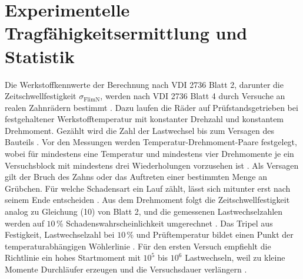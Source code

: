 \section{Experimentelle Tragfähigkeitsermittlung und Statistik}
\label{sec:experiment_stand}

Die Werkstoffkennwerte der Berechnung nach VDI 2736 Blatt 2, darunter die Zeitschwellfestigkeit $\sigma_{\mathrm{FlimN}}$, werden nach VDI 2736 Blatt 4 durch Versuche an realen Zahnrädern bestimmt \cite[Abschnitt~3, S.~5]{VDI2736-4}. Dazu laufen die Räder auf Prüfstandsgetrieben bei festgehaltener Werkstofftemperatur mit konstanter Drehzahl und konstantem Drehmoment. Gezählt wird die Zahl der Lastwechsel bis zum Versagen des Bauteils \cite[S.~6]{VDI2736-4}. Vor den Messungen werden Temperatur-Drehmoment-Paare festgelegt, wobei für mindestens eine Temperatur und mindestens vier Drehmomente je ein Versuchsblock mit mindestens drei Wiederholungen vorzusehen ist \cite[Abschnitt~3.1, S.~6]{VDI2736-4}. Als Versagen gilt der Bruch des Zahns oder das Auftreten einer bestimmten Menge an Grübchen. Für welche Schadensart ein Lauf zählt, lässt sich mitunter erst nach seinem Ende entscheiden \cite[S.~6]{VDI2736-4}. Aus dem Drehmoment folgt die Zeitschwellfestigkeit analog zu Gleichung (10) von Blatt 2, und die gemessenen Lastwechselzahlen werden auf $10$\,\% Schadenswahrscheinlichkeit umgerechnet \cite[Abschnitt~3.3, S.~7]{VDI2736-4}. Das Tripel aus Festigkeit, Lastwechselzahl bei $10$\,\% und Prüftemperatur bildet einen Punkt der temperaturabhängigen Wöhlerlinie \cite[S.~7]{VDI2736-4}. Für den ersten Versuch empfiehlt die Richtlinie ein hohes Startmoment mit $10^{5}$ bis $10^{6}$ Lastwechseln, weil zu kleine Momente Durchläufer erzeugen und die Versuchsdauer verlängern \cite[Abschnitt~8.4, S.~20]{VDI2736-4}.

